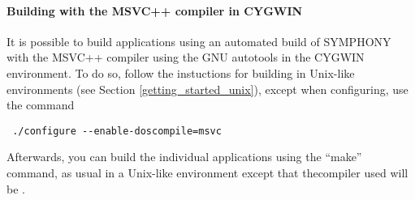 \paragraph{Building with the MSVC++ compiler in CYGWIN}

It is possible to build applications using an automated build of SYMPHONY
with the MSVC++ compiler  using the GNU autotools in the CYGWIN
environment. To do so, follow the instuctions for building in Unix-like
environments (see Section \ref{getting_started_unix}), except when
configuring, use the command

{\color{Brown}
\begin{verbatim}
 ./configure --enable-doscompile=msvc
\end{verbatim}}

Afterwards, you can build the individual applications using the ``make''
command, as usual in a Unix-like environment except that thecompiler used will
be .
